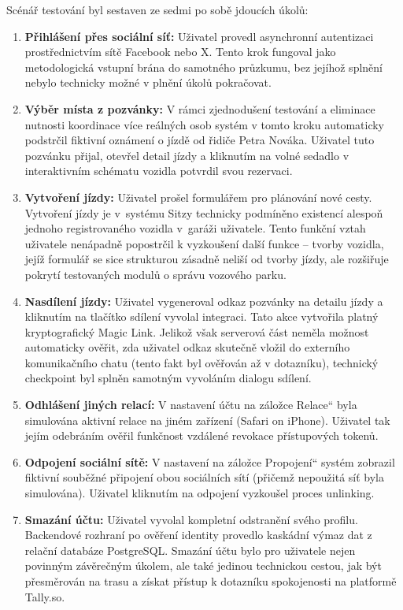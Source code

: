 \documentclass[male,czech,api_bc]{kitheses}
\newcommand{\UV}[1]{\quotedblbase#1\textquotedblleft}
\begin{document}
Scénář testování byl sestaven ze sedmi po sobě jdoucích úkolů:
\begin{enumerate}
    \item \textbf{Přihlášení přes sociální síť:} Uživatel provedl asynchronní autentizaci prostřednictvím sítě Facebook nebo X. Tento krok fungoval jako metodologická vstupní brána do samotného průzkumu, bez jejíhož splnění nebylo technicky možné v plnění úkolů pokračovat.
    
    \item \textbf{Výběr místa z pozvánky:} V rámci zjednodušení testování a eliminace nutnosti koordinace více reálných osob systém v tomto kroku automaticky podstrčil fiktivní oznámení o jízdě od řidiče Petra Nováka. Uživatel tuto pozvánku přijal, otevřel detail jízdy a kliknutím na volné sedadlo v interaktivním schématu vozidla  potvrdil svou rezervaci.
    
    \item \textbf{Vytvoření jízdy:} Uživatel prošel formulářem pro plánování nové cesty. Vytvoření jízdy je v~systému Sitzy technicky podmíněno existencí alespoň jednoho registrovaného vozidla v~garáži uživatele. Tento funkční vztah uživatele nenápadně popostrčil k vyzkoušení další funkce -- tvorby vozidla, jejíž formulář se sice strukturou zásadně neliší od tvorby jízdy, ale rozšiřuje pokrytí testovaných modulů o správu vozového parku.
    
    \item \textbf{Nasdílení jízdy:} Uživatel vygeneroval odkaz pozvánky na detailu jízdy a kliknutím na tlačítko sdílení vyvolal integraci. Tato akce vytvořila platný kryptografický Magic Link. Jelikož však serverová část neměla možnost automaticky ověřit, zda uživatel odkaz skutečně vložil do externího komunikačního chatu (tento fakt byl ověřován až v dotazníku), technický checkpoint byl splněn samotným vyvoláním dialogu sdílení.
    
    \item \textbf{Odhlášení jiných relací:} V nastavení účtu na záložce \UV{Relace} byla simulována aktivní relace na jiném zařízení (Safari on iPhone). Uživatel tak jejím odebráním ověřil funkčnost vzdálené revokace přístupových tokenů.
    
    \item \textbf{Odpojení sociální sítě:} V nastavení na záložce \UV{Propojení} systém zobrazil fiktivní souběžné připojení obou sociálních sítí (přičemž nepoužitá síť byla simulována). Uživatel kliknutím na odpojení vyzkoušel proces unlinking.
    
    \item \textbf{Smazání účtu:} Uživatel vyvolal kompletní odstranění svého profilu. Backendové rozhraní po ověření identity provedlo kaskádní výmaz dat z relační databáze PostgreSQL. Smazání účtu bylo pro uživatele nejen povinným závěrečným úkolem, ale také jedinou technickou cestou, jak být přesměrován na trasu  a získat přístup k dotazníku spokojenosti na platformě Tally.so.
\end{enumerate}
\end{document}
